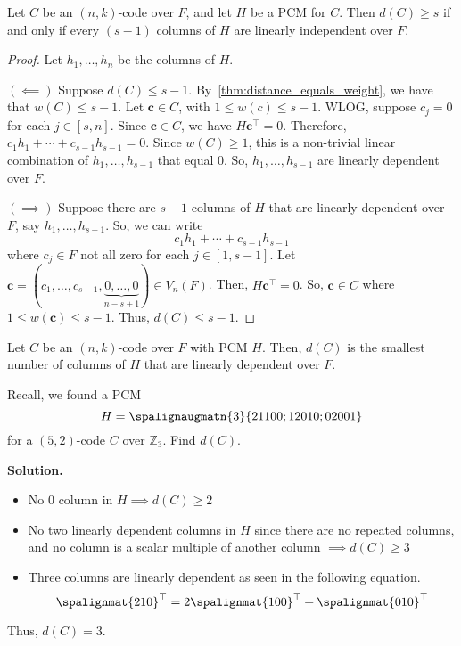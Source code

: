 
\begin{Theorem}{}{}
    Let $ C $ be an $ (n,k) $-code over $ F $, and let $ H $ be a PCM
    for $ C $. Then $ d(C)\geqslant s $ if and only if every $ (s-1) $ columns
    of $ H $ are linearly independent over $ F $.
\end{Theorem}

\begin{proof}
    Let $ h_1,\ldots ,h_n $ be the columns of $ H $.

    $ (\impliedby) $ Suppose $ d(C)\leqslant s-1 $. By~\ref{thm:distance_equals_weight},
    we have that $ w(C)\leqslant s-1 $.
    Let $ \bm{c}\in C $, with $ 1\leqslant w(c)\leqslant s-1 $. WLOG, suppose
    $ c_j=0 $ for each $ j\in[s,n] $. Since $ \bm{c}\in C $,
    we have $ H\bm{c}^{\top}=0 $. Therefore,
    $ c_1h_1+\cdots+c_{s-1}h_{s-1}=0 $.
    Since $ w(C)\geqslant 1 $, this is a non-trivial linear combination
    of $ h_1,\ldots ,h_{s-1} $ that equal $ 0 $. So,
    $ h_1,\ldots ,h_{s-1} $ are linearly dependent over $ F $.

    $ (\implies) $ Suppose there are $ s-1 $ columns of $ H $ that
    are linearly dependent over $ F $, say $ h_1,\ldots ,h_{s-1} $. So,
    we can write
    \[ c_1h_1+\cdots+c_{s-1}h_{s-1} \]
    where $ c_j\in F $ not all zero for each $ j\in[1,s-1] $.
    Let $ \bm{c}=(c_1,\ldots ,c_{s-1},
        \underbrace{0,\ldots,0}_{n-s+1})\in V_n(F) $. Then,
    $ H\bm{c}^{\top}=0 $. So, $ \bm{c}\in C $ where $ 1\leqslant w(\bm{c})\leqslant s-1 $.
    Thus, $ d(C)\leqslant s-1 $.
\end{proof}

\begin{Corollary}{}{}
    Let $ C $ be an $ (n,k) $-code over $ F $ with PCM $ H $. Then,
    $ d(C) $ is the smallest number of columns of $ H $ that
    are linearly dependent over $ F $.
\end{Corollary}

\begin{Example}{}{}
    Recall, we found a PCM
    \[ H=\spalignaugmatn{3}{
            2 1 1 0 0;
            1 2 0 1 0;
            0 2 0 0 1} \]
    for a $ (5,2) $-code $ C $ over $ \mathbb{Z}_3 $. Find $ d(C) $.

    \textbf{Solution.}
    \begin{itemize}
        \item No $ 0 $ column in $ H\implies d(C)\geqslant 2 $
        \item No two linearly dependent columns in $ H $ since there are
              no repeated columns, and no column is a scalar multiple of another
              column $ \implies d(C)\geqslant 3 $
        \item Three columns are linearly dependent as seen in the following equation.
              \[ \spalignmat{2 1 0}^\top=2\spalignmat{1 0 0}^\top+\spalignmat{0 1 0}^\top \]
    \end{itemize}
    Thus, $ d(C)=3 $.
\end{Example}

